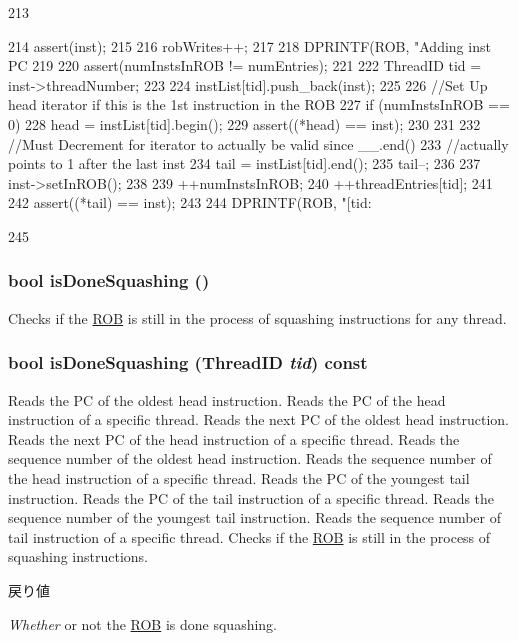 \begin{DoxyCode}
213 {
214     assert(inst);
215 
216     robWrites++;
217 
218     DPRINTF(ROB, "Adding inst PC %
219 
220     assert(numInstsInROB != numEntries);
221 
222     ThreadID tid = inst->threadNumber;
223 
224     instList[tid].push_back(inst);
225 
226     //Set Up head iterator if this is the 1st instruction in the ROB
227     if (numInstsInROB == 0) {
228         head = instList[tid].begin();
229         assert((*head) == inst);
230     }
231 
232     //Must Decrement for iterator to actually be valid  since __.end()
233     //actually points to 1 after the last inst
234     tail = instList[tid].end();
235     tail--;
236 
237     inst->setInROB();
238 
239     ++numInstsInROB;
240     ++threadEntries[tid];
241 
242     assert((*tail) == inst);
243 
244     DPRINTF(ROB, "[tid:%
      
245 }
\end{DoxyCode}
\hypertarget{classROB_a361dee23017319068ba1585a4c393868}{
\subsubsection[{isDoneSquashing}]{\setlength{\rightskip}{0pt plus 5cm}bool isDoneSquashing ()}}
\label{classROB_a361dee23017319068ba1585a4c393868}
Checks if the \hyperlink{classROB}{ROB} is still in the process of squashing instructions for any thread. \hypertarget{classROB_acd4497e40e00ada9d4d15336dcb35be8}{
\subsubsection[{isDoneSquashing}]{\setlength{\rightskip}{0pt plus 5cm}bool isDoneSquashing ({\bf ThreadID} {\em tid}) const}}
\label{classROB_acd4497e40e00ada9d4d15336dcb35be8}
Reads the PC of the oldest head instruction. Reads the PC of the head instruction of a specific thread. Reads the next PC of the oldest head instruction. Reads the next PC of the head instruction of a specific thread. Reads the sequence number of the oldest head instruction. Reads the sequence number of the head instruction of a specific thread. Reads the PC of the youngest tail instruction. Reads the PC of the tail instruction of a specific thread. Reads the sequence number of the youngest tail instruction. Reads the sequence number of tail instruction of a specific thread. Checks if the \hyperlink{classROB}{ROB} is still in the process of squashing instructions. 
\begin{DoxyRetVals}{戻り値}
\item[{\em Whether}]or not the \hyperlink{classROB}{ROB} is done squashing. \end{DoxyRetVals}



